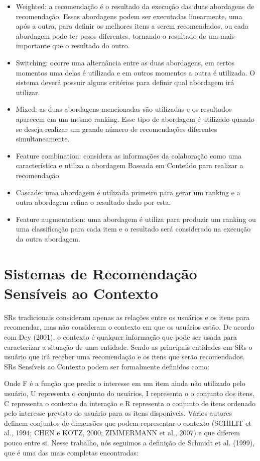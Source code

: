 \begin{itemize}
\item Weighted: a recomendação é o resultado da execução das duas abordagens de recomendação. Essas abordagens podem ser executadas linearmente, uma após a outra, para definir os melhores itens a serem recomendados, ou cada abordagem pode ter pesos diferentes, tornando o resultado de um mais importante que o resultado do outro.
\item Switching: ocorre uma alternância entre as duas abordagens, em certos momentos uma delas é utilizada e em outros momentos a outra é utilizada. O sistema deverá possuir alguns critérios para definir qual abordagem irá utilizar.
\item Mixed: as duas abordagens mencionadas são utilizadas e os resultados aparecem em um mesmo ranking. Esse tipo de abordagem é utilizado quando se deseja realizar um grande número de recomendações diferentes simultaneamente.
\item Feature combination: considera as informações da colaboração como uma característica e utiliza a abordagem Baseada em Conteúdo para realizar a recomendação.
\item Cascade: uma abordagem é utilizada primeiro para gerar um ranking e a outra abordagem refina o resultado dado por esta.
\item Feature augmentation: uma abordagem é utiliza para produzir um ranking ou uma classificação para cada item e o resultado será considerado na execução da outra abordagem.
\end{itemize}

\section{Sistemas de Recomendação Sensíveis ao Contexto}

SRs tradicionais consideram apenas as relações entre os usuários e os itens para recomendar, mas não consideram o contexto em que os usuários estão. De acordo com Dey (2001), o contexto é qualquer informação que pode ser usada para caracterizar a situação de uma entidade. Sendo as principais entidades em SRs o usuário que irá receber uma recomendação e os itens que serão recomendados.
SRs Sensíveis ao Contexto podem ser formalmente definidos como:

Onde F é a função que prediz o interesse em um item ainda não utilizado pelo usuário, U representa o conjunto do usuários, I representa o o conjunto dos itens, C representa o contexto da interação e R representa o conjunto de itens ordenado pelo interesse previsto do usuário para os itens disponíveis.
Vários autores definem conjuntos de dimensões que podem representar o contexto (SCHILIT et al., 1994; CHEN e KOTZ, 2000; ZIMMERMANN et al., 2007) e que diferem pouco entre si. Nesse trabalho, nós seguimos a definição de Schmidt et al. (1999), que é uma das mais completas encontradas:

